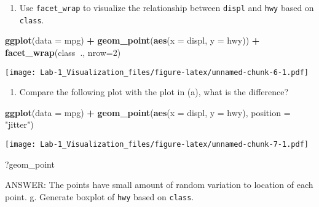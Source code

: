 \documentclass[]{article}
\newenvironment{Shaded}{\begin{snugshade}}{\end{snugshade}}
\newcommand{\DataTypeTok}[1]{\textcolor[rgb]{0.13,0.29,0.53}{#1}}
\newcommand{\DecValTok}[1]{\textcolor[rgb]{0.00,0.00,0.81}{#1}}
\newcommand{\KeywordTok}[1]{\textcolor[rgb]{0.13,0.29,0.53}{\textbf{#1}}}
\newcommand{\NormalTok}[1]{#1}
\newcommand{\OperatorTok}[1]{\textcolor[rgb]{0.81,0.36,0.00}{\textbf{#1}}}
\newcommand{\StringTok}[1]{\textcolor[rgb]{0.31,0.60,0.02}{#1}}
\providecommand{\tightlist}{%
  \setlength{\itemsep}{0pt}\setlength{\parskip}{0pt}}
\begin{document}
\begin{enumerate}
\def\labelenumi{\alph{enumi}.}
\setcounter{enumi}{4}
\tightlist
\item
  Use \texttt{facet\_wrap} to visualize the relationship between
  \texttt{displ} and \texttt{hwy} based on \texttt{class}.
\end{enumerate}

\begin{Shaded}
\begin{Highlighting}[]
\KeywordTok{ggplot}\NormalTok{(}\DataTypeTok{data =}\NormalTok{ mpg) }\OperatorTok{+}
\StringTok{    }\KeywordTok{geom_point}\NormalTok{(}\KeywordTok{aes}\NormalTok{(}\DataTypeTok{x =}\NormalTok{ displ, }\DataTypeTok{y =}\NormalTok{ hwy)) }\OperatorTok{+}
\StringTok{    }\KeywordTok{facet_wrap}\NormalTok{(class}\OperatorTok{~}\NormalTok{., }\DataTypeTok{nrow=}\DecValTok{2}\NormalTok{)}
\end{Highlighting}
\end{Shaded}

\texttt{[image: Lab-1\_Visualization\_files/figure-latex/unnamed-chunk-6-1.pdf]}

\begin{enumerate}
\def\labelenumi{\alph{enumi}.}
\setcounter{enumi}{5}
\tightlist
\item
  Compare the following plot with the plot in (a), what is the
  difference?
\end{enumerate}

\begin{Shaded}
\begin{Highlighting}[]
\KeywordTok{ggplot}\NormalTok{(}\DataTypeTok{data =}\NormalTok{ mpg) }\OperatorTok{+}\StringTok{ }
\StringTok{    }\KeywordTok{geom_point}\NormalTok{(}\KeywordTok{aes}\NormalTok{(}\DataTypeTok{x =}\NormalTok{ displ, }\DataTypeTok{y =}\NormalTok{ hwy), }\DataTypeTok{position =} \StringTok{"jitter"}\NormalTok{)}
\end{Highlighting}
\end{Shaded}

\texttt{[image: Lab-1\_Visualization\_files/figure-latex/unnamed-chunk-7-1.pdf]}

\begin{Shaded}
\begin{Highlighting}[]
\NormalTok{?geom_point}
\end{Highlighting}
\end{Shaded}

ANSWER: The points have small amount of random variation to location of
each point. g. Generate boxplot of \texttt{hwy} based on \texttt{class}.
\end{document}
